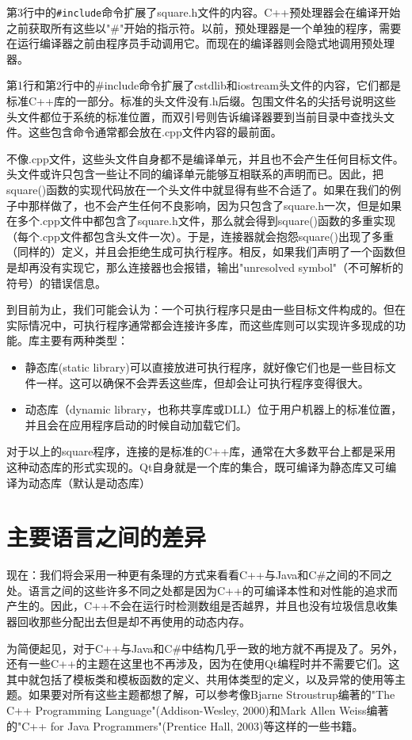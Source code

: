 \documentclass[11pt,oneside]{book}
\begin{document}
\begin{common-format}
第3行中的\verb+#include+命令扩展了square.h文件的内容。C++预处理器会在编译开始之前获取所有这些以"\#{}"开始的指示符。以前，预处理器是一个单独的程序，需要在运行编译器之前由程序员手动调用它。而现在的编译器则会隐式地调用预处理器。

第1行和第2行中的\#{}include命令扩展了cstdlib和iostream头文件的内容，它们都是标准C++库的一部分。标准的头文件没有.h后缀。包围文件名的尖括号说明这些头文件都位于系统的标准位置，而双引号则告诉编译器要到当前目录中查找头文件。这些包含命令通常都会放在.cpp文件内容的最前面。

不像.cpp文件，这些头文件自身都不是编译单元，并且也不会产生任何目标文件。头文件或许只包含一些让不同的编译单元能够互相联系的声明而已。因此，把square()函数的实现代码放在一个头文件中就显得有些不合适了。如果在我们的例子中那样做了，也不会产生任何不良影响，因为只包含了square.h一次，但是如果在多个.cpp文件中都包含了square.h文件，那么就会得到square()函数的多重实现（每个.cpp文件都包含头文件一次）。于是，连接器就会抱怨square()出现了多重（同样的）定义，并且会拒绝生成可执行程序。相反，如果我们声明了一个函数但是却再没有实现它，那么连接器也会报错，输出"unresolved symbol"（不可解析的符号）的错误信息。

到目前为止，我们可能会认为：一个可执行程序只是由一些目标文件构成的。但在实际情况中，可执行程序通常都会连接许多库，而这些库则可以实现许多现成的功能。库主要有两种类型：
\begin{itemize}
\item 静态库(static library)可以直接放进可执行程序，就好像它们也是一些目标文件一样。这可以确保不会弄丢这些库，但却会让可执行程序变得很大。
\item 动态库（dynamic library，也称共享库或DLL）位于用户机器上的标准位置，并且会在应用程序启动的时候自动加载它们。 
\end{itemize}

对于以上的square程序，连接的是标准的C++库，通常在大多数平台上都是采用这种动态库的形式实现的。Qt自身就是一个库的集合，既可编译为静态库又可编译为动态库（默认是动态库）


\section{主要语言之间的差异}
现在：我们将会采用一种更有条理的方式来看看C++与Java和C\#{}之间的不同之处。语言之间的这些许多不同之处都是因为C++的可编译本性和对性能的追求而产生的。因此，C++不会在运行时检测数组是否越界，并且也没有垃圾信息收集器回收那些分配出去但是却不再使用的动态内存。

为简便起见，对于C++与Java和C\#{}中结构几乎一致的地方就不再提及了。另外，还有一些C++的主题在这里也不再涉及，因为在使用Qt编程时并不需要它们。这其中就包括了模板类和模板函数的定义、共用体类型的定义，以及异常的使用等主题。如果要对所有这些主题都想了解，可以参考像Bjarne Stroustrup编著的"The C++ Programming Language"(Addison-Wesley, 2000)和Mark Allen Weiss编著的"C++ for Java Programmers"(Prentice Hall, 2003)等这样的一些书籍。


\end{common-format}
\end{document}
